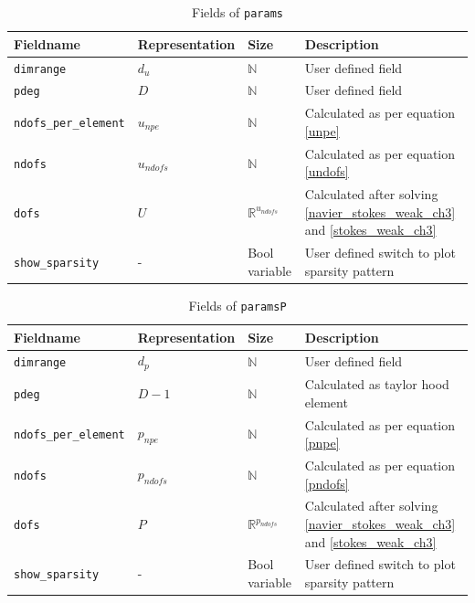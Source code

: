 \documentclass[a4paper]{book}
\begin{document}
\begin{table}
\cprotect\caption{Fields of \verb|params|}
\label{table_params}
\begin{center}
\begin{tabular}{| p{}| p{} |  p{} | p{}|} 
\hline
\textbf{Fieldname} & \textbf{Representation} & \textbf{Size} & \textbf{Description}\\
\hline
\verb|dimrange| & $d_u$ & $\mathbb{N}$ & User defined field\\
\hline
\verb|pdeg| & $D$ & $\mathbb{N}$ & User defined field\\
\hline
\verb|ndofs_per_element| & $u_{npe}$ & $\mathbb{N}$ & Calculated as per equation \ref{unpe}\\
\hline
\verb|ndofs| & $u_{ndofs}$ & $\mathbb{N}$ & Calculated as per equation \ref{undofs}\\
\hline
\verb|dofs| & $U$ & $\mathbb{R}^{u_{ndofs}}$ & Calculated after solving \ref{navier_stokes_weak_ch3} and \ref{stokes_weak_ch3}\\
\hline
\verb|show_sparsity| & - & Bool variable & User defined switch to plot sparsity pattern\\
\hline
\end{tabular}
\end{center}
\end{table}

\begin{table}
\cprotect\caption{Fields of \verb|paramsP|}
\label{table_paramsP}
\begin{center}
\begin{tabular}{| p{}| p{} |  p{} | p{}|}
\hline
\textbf{Fieldname} & \textbf{Representation} & \textbf{Size} & \textbf{Description}\\
\hline
\verb|dimrange| & $d_p$ & $\mathbb{N}$ & User defined field\\
\hline
\verb|pdeg| & $D-1$ & $\mathbb{N}$ & Calculated as taylor hood element\\
\hline
\verb|ndofs_per_element| & $p_{npe}$ & $\mathbb{N}$ & Calculated as per equation \ref{pnpe}\\
\hline
\verb|ndofs| & $p_{ndofs}$ & $\mathbb{N}$ & Calculated as per equation \ref{pndofs}\\
\hline
\verb|dofs| & $P$ & $\mathbb{R}^{p_{ndofs}}$ & Calculated after solving \ref{navier_stokes_weak_ch3} and \ref{stokes_weak_ch3}\\
\hline
\verb|show_sparsity| & - & Bool variable & User defined switch to plot sparsity pattern\\
\hline
\end{tabular}
\end{center}
\end{table}
\end{document}
